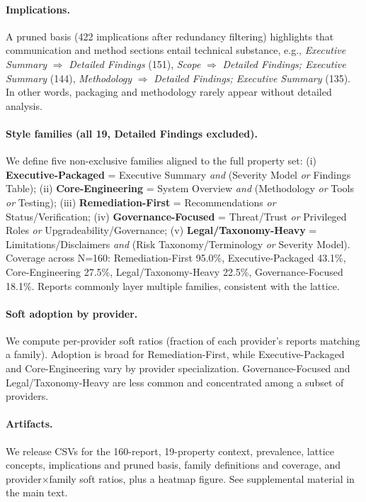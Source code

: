 \paragraph{Implications.} A pruned basis (422 implications after redundancy filtering) highlights that communication and method sections entail
technical substance, e.g., \emph{Executive Summary} $\Rightarrow$ \emph{Detailed Findings} (151), \emph{Scope} $\Rightarrow$ \emph{Detailed Findings; Executive Summary} (144),
\emph{Methodology} $\Rightarrow$ \emph{Detailed Findings; Executive Summary} (135). In other words, packaging and methodology rarely appear without detailed analysis.

\paragraph{Style families (all 19, Detailed Findings excluded).} We define five non-exclusive families aligned to the full property set:
(i) \textbf{Executive-Packaged} = Executive Summary \emph{and} (Severity Model \emph{or} Findings Table);
(ii) \textbf{Core-Engineering} = System Overview \emph{and} (Methodology \emph{or} Tools \emph{or} Testing);
(iii) \textbf{Remediation-First} = Recommendations \emph{or} Status/Verification;
(iv) \textbf{Governance-Focused} = Threat/Trust \emph{or} Privileged Roles \emph{or} Upgradeability/Governance;
(v) \textbf{Legal/Taxonomy-Heavy} = Limitations/Disclaimers \emph{and} (Risk Taxonomy/Terminology \emph{or} Severity Model).
Coverage across N=160: Remediation-First 95.0\%, Executive-Packaged 43.1\%, Core-Engineering 27.5\%,
Legal/Taxonomy-Heavy 22.5\%, Governance-Focused 18.1\%. Reports commonly layer multiple families, consistent with the lattice.

\paragraph{Soft adoption by provider.} We compute per-provider soft ratios (fraction of each provider's reports matching a family).
Adoption is broad for Remediation-First, while Executive-Packaged and Core-Engineering vary by provider specialization.
Governance-Focused and Legal/Taxonomy-Heavy are less common and concentrated among a subset of providers.

\paragraph{Artifacts.} We release CSVs for the 160-report, 19-property context, prevalence, lattice concepts, implications and pruned basis,
family definitions and coverage, and provider$\times$family soft ratios, plus a heatmap figure. See supplemental material in the main text.
